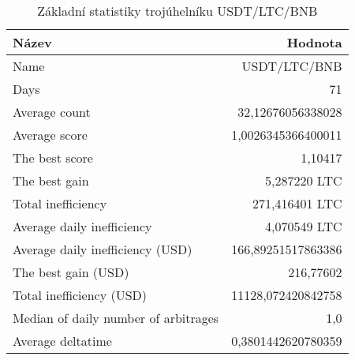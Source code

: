 \begin{table}\centering
\caption{Základní statistiky trojúhelníku USDT/LTC/BNB}
\label{USDTLTCBNB_stats}
\begin{tabular}{|| l | r ||}
\hline Název & Hodnota \\ 
\hline\hline Name & USDT/LTC/BNB \\ 
\hline Days & 71 \\ 
\hline Average count & 32,12676056338028 \\ 
\hline Average score & 1,0026345366400011 \\ 
\hline The best score & 1,10417 \\ 
\hline The best gain & 5,287220 LTC \\ 
\hline Total inefficiency & 271,416401 LTC \\ 
\hline Average daily inefficiency & 4,070549 LTC \\ 
\hline Average daily inefficiency (USD) & 166,89251517863386 \\ 
\hline The best gain (USD) & 216,77602 \\ 
\hline Total inefficiency (USD) & 11128,072420842758 \\ 
\hline Median of daily number of arbitrages & 1,0 \\ 
\hline Average deltatime & 0,3801442620780359 \\ 
\hline
\end{tabular}
\end{table}